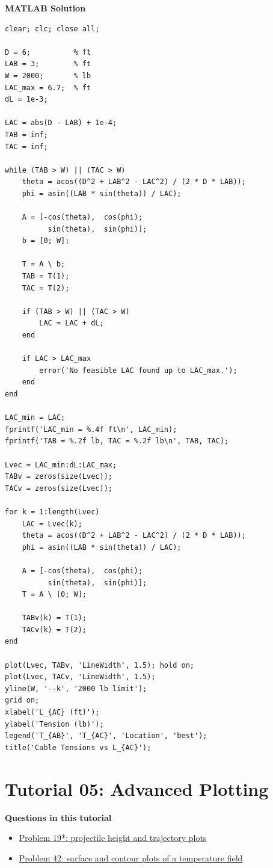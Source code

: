 \documentclass[12pt]{article}
\newcommand{\tutorialsection}[2]{%
    \clearpage
    \phantomsection
    \hypertarget{#1}{}%
    \section*{#2}
}
\newcommand{\solutiontitle}{\noindent\textbf{MATLAB Solution}}
\newcommand{\minitoc}[1]{%
    \noindent\textbf{Questions in this tutorial}
    \begin{itemize}[leftmargin=1.5em, itemsep=0.2em]
        #1
    \end{itemize}
}
\begin{document}
\solutiontitle
\begin{lstlisting}
clear; clc; close all;

D = 6;          % ft
LAB = 3;        % ft
W = 2000;       % lb
LAC_max = 6.7;  % ft
dL = 1e-3;

LAC = abs(D - LAB) + 1e-4;
TAB = inf;
TAC = inf;

while (TAB > W) || (TAC > W)
    theta = acos((D^2 + LAB^2 - LAC^2) / (2 * D * LAB));
    phi = asin((LAB * sin(theta)) / LAC);

    A = [-cos(theta),  cos(phi);
          sin(theta),  sin(phi)];
    b = [0; W];

    T = A \ b;
    TAB = T(1);
    TAC = T(2);

    if (TAB > W) || (TAC > W)
        LAC = LAC + dL;
    end

    if LAC > LAC_max
        error('No feasible LAC found up to LAC_max.');
    end
end

LAC_min = LAC;
fprintf('LAC_min = %.4f ft\n', LAC_min);
fprintf('TAB = %.2f lb, TAC = %.2f lb\n', TAB, TAC);

Lvec = LAC_min:dL:LAC_max;
TABv = zeros(size(Lvec));
TACv = zeros(size(Lvec));

for k = 1:length(Lvec)
    LAC = Lvec(k);
    theta = acos((D^2 + LAB^2 - LAC^2) / (2 * D * LAB));
    phi = asin((LAB * sin(theta)) / LAC);

    A = [-cos(theta),  cos(phi);
          sin(theta),  sin(phi)];
    T = A \ [0; W];

    TABv(k) = T(1);
    TACv(k) = T(2);
end

plot(Lvec, TABv, 'LineWidth', 1.5); hold on;
plot(Lvec, TACv, 'LineWidth', 1.5);
yline(W, '--k', '2000 lb limit');
grid on;
xlabel('L_{AC} (ft)');
ylabel('Tension (lb)');
legend('T_{AB}', 'T_{AC}', 'Location', 'best');
title('Cable Tensions vs L_{AC}');
\end{lstlisting}

\tutorialsection{tut5}{Tutorial 05: Advanced Plotting}
\minitoc{
    \item \hyperlink{tut5-q19}{Problem 19*: projectile height and trajectory plots}
    \item \hyperlink{tut5-q42}{Problem 42: surface and contour plots of a temperature field}
}
\end{document}
